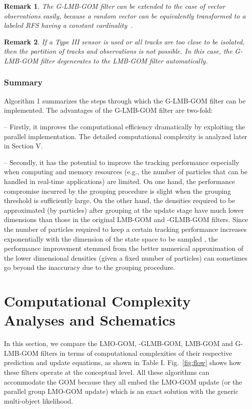 \documentclass[journal]{IEEEtran}
\newtheorem{Rem}{Remark}
\begin{document}
{\begin{Rem}\label{remark:8}
The G-LMB-GOM filter can be extended to the case of vector observations easily, because a random vector can be equivalently transformed to a labeled RFS having a constant cardinality~\cite{set-jpda}. 
\end{Rem} 

\begin{Rem}\label{remark:8}
If a Type III sensor is used or all tracks are too close to be isolated, then the partition of tracks and observations is not possible. In this case, the G-LMB-GOM filter degenerates to the LMB-GOM filter automatically. 
\end{Rem} 
\subsubsection{Summary}
Algorithm 1 summarizes the steps through which the G-LMB-GOM filter can be implemented.  The advantages of  the G-LMB-GOM filter are two-fold:

\noindent-- Firstly, it  improves the computational efficiency dramatically by exploiting the  parallel  implementation. The detailed computational complexity is analyzed later in Section V. 

\noindent-- Secondly, it has the potential to improve the tracking performance especially when computing and memory resources (e.g., the  number of particles that can be handled in real-time applications) are limited. On one hand, the performance compromise incurred by the grouping procedure  is slight  when the grouping threshold is sufficiently large. On the other hand,   the densities required to be approximated (by particles) after grouping at the update stage have much lower dimensions than those in the original LMB-GOM and -GLMB-GOM filters.  Since the number of particles required to keep a certain tracking performance increases exponentially with the dimension of the state space to be sampled \cite{refr:curse_dimension,refr:tbd-3}, the performance improvement stemmed from the better numerical approximation of the lower dimensional densities (given a fixed number of particles)  can sometimes go   beyond the inaccuracy due to the grouping procedure.






\section{Computational Complexity Analyses and Schematics}\label{chp:6}
In this section, we compare the LMO-GOM, -GLMB-GOM, LMB-GOM and G-LMB-GOM filters
 in terms of 
computational complexities of their respective prediction and update equations, as shown in Table I. Fig.~\ref{fig:flow} shows how these filters operate at the conceptual level.  
All these algorithms can accommodate the GOM because they all embed the  LMO-GOM update (or the parallel group LMO-GOM update)  which is  an exact solution with the generic multi-object likelihood. 



}
\end{document}
